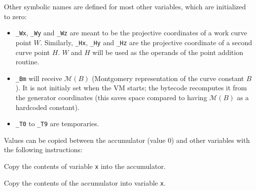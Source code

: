 \documentclass{llncs}
\newcommand{\mont}[1]{\mathcal{M}(#1)}
\begin{document}
Other symbolic names are defined for most other variables, which are
initialized to zero:
\begin{itemize}

    \item \verb+_Wx+, \verb+_Wy+ and \verb+_Wz+ are meant to be the
    projective coordinates of a work curve point $W$. Similarly,
    \verb+_Hx+, \verb+_Hy+ and \verb+_Hz+ are the projective coordinate
    of a second curve point $H$. $W$ and $H$ will be used as the
    operands of the point addition routine.

    \item \verb+_Bm+ will receive $\mont{B}$ (Montgomery representation
    of the curve constant $B$). It is not initialy set when the VM
    starts; the bytecode recomputes it from the generator coordinates
    (this saves space compared to having $\mont{B}$ as a hardcoded
    constant).

    \item \verb+_T0+ to \verb+_T9+ are temporaries.

\end{itemize}

\newenvironment{codedesc3}
    {\begin{list}
        {}
        {\setlength{\labelwidth}{6em}
         \setlength{\labelsep}{0.5em}
         \setlength{\itemsep}{1ex}
         \setlength{\leftmargin}{6.5em}
         \setlength{\rightmargin}{0em}
         \let\makelabel=\makecodedesclabel
        }
    }
    {\end{list}}

Values can be copied between the accumulator (value 0) and other variables
with the following instructions:
\begin{codedesc3}

    \item[\_LD x] Copy the contents of variable \verb+x+ into the accumulator.

    \item[\_ST x] Copy the contents of the accumulator into variable \verb+x+.

\end{codedesc3}
\end{document}
